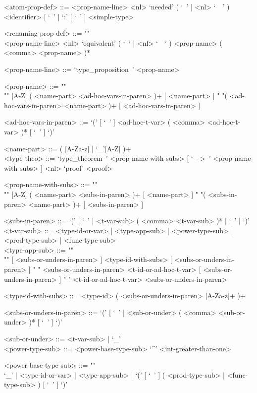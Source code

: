 \documentclass{article}
\begin{document}
\begin{grammar}
<atom-prop-def> ::=
<prop-name-line> <nl> `needed' ( `\ ' | <nl> `\ \ ' )
<identifier> [ `\ ' ] `:' [ `\ ' ] <simple-type>

<renaming-prop-def> ::= ""\\
<prop-name-line> <nl>
`equivalent' ( `\ ' | <nl> `\ \ ' ) <prop-name> ( <comma> <prop-name> )*

<prop-name-line> ::= `type_proposition\ ' <prop-name>

<prop-name> ::=  ""\\""
[A-Z] ( <name-part> <ad-hoc-vars-in-paren> )+ [ <name-part> ]
\alt " "( <ad-hoc-vars-in-paren> <name-part> )+ [ <ad-hoc-vars-in-paren> ]

<ad-hoc-vars-in-paren> ::=
`(' [ `\ ' ] <ad-hoc-t-var> ( <comma> <ad-hoc-t-var> )* [ `\ ' ] `)'

<name-part> ::= ( [A-Za-z] | `_'[A-Z] )+
\\

\newpage
<type-theo> ::= 
`type_theorem\ ' <prop-name-with-subs> [ `\ -->\ ' <prop-name-with-subs> ] <nl> 
`proof' <proof>

<prop-name-with-subs> ::=  ""\\""
[A-Z] ( <name-part> <subs-in-paren> )+ [ <name-part> ]
\alt " "( <subs-in-paren> <name-part> )+ [ <subs-in-paren> ]

<subs-in-paren> ::=
`(' [ `\ ' ] <t-var-sub> ( <comma> <t-var-sub> )* [ `\ ' ] `)'
\\

<t-var-sub> ::=
<type-id-or-var> | <type-app-sub> | <power-type-sub> | <prod-type-sub> |
<func-type-sub> 
\\

<type-app-sub> ::= ""\\""
[ <subs-or-unders-in-paren> ] <type-id-with-subs> [ <subs-or-unders-in-paren> ]
\alt " "
<subs-or-unders-in-paren> <t-id-or-ad-hoc-t-var> [ <subs-or-unders-in-paren> ]
\alt " "
<t-id-or-ad-hoc-t-var> <subs-or-unders-in-paren>

<type-id-with-subs> ::= <type-id> ( <subs-or-unders-in-paren> [A-Za-z]+ )+

<subs-or-unders-in-paren> ::=
`(' [ `\ ' ] <sub-or-under> ( <comma> <sub-or-under> )* [ `\ ' ] `)'

<sub-or-under> ::= <t-var-sub> | `_'
\\

<power-type-sub> ::= <power-base-type-sub> `^' <int-greater-than-one>

<power-base-type-sub> ::= ""\\
`_' | <type-id-or-var> | <type-app-sub> |
`(' [ `\ ' ] ( <prod-type-sub> | <func-type-sub> ) [ `\ ' ] `)'
\\


\end{grammar}
\end{document}
